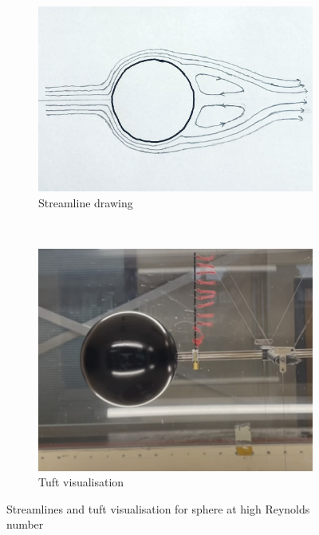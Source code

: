 \documentclass[8pt]{article}
\begin{document}
\begin{figure}[H]
    \centering
    \begin{subfigure}[t]{0.48\textwidth}
        \centering
        \includegraphics[width=1\textwidth]{Images_Videos/stream_hi_Re_sphere_2.jpg}
        \caption{Streamline drawing}
        \label{fig:figure8}
    \end{subfigure}
    ~
    \begin{subfigure}[t]{0.4\textwidth}
        \centering
        \includegraphics[width=1\textwidth]{Images_Videos/sphere_high_Re.jpg}
        \caption{Tuft visualisation}
        \label{fig:figure9}
    \end{subfigure}
    \caption{Streamlines and tuft visualisation for sphere at high Reynolds number}
\end{figure}
\end{document}
